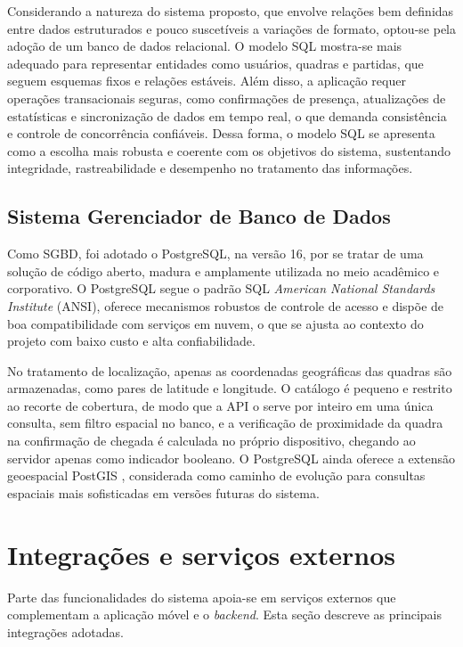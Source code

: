         Considerando a natureza do sistema proposto, que envolve relações bem definidas entre dados estruturados e pouco suscetíveis a variações de formato, optou-se pela adoção de um banco de dados relacional. O modelo SQL mostra-se mais adequado para representar entidades como usuários, quadras e partidas, que seguem esquemas fixos e relações estáveis. Além disso, a aplicação requer operações transacionais seguras, como confirmações de presença, atualizações de estatísticas e sincronização de dados em tempo real, o que demanda consistência e controle de concorrência confiáveis. Dessa forma, o modelo SQL se apresenta como a escolha mais robusta e coerente com os objetivos do sistema, sustentando integridade, rastreabilidade e desempenho no tratamento das informações.

        \subsection{Sistema Gerenciador de Banco de Dados}

        Como SGBD, foi adotado o PostgreSQL, na versão 16, por se tratar de uma solução de código aberto, madura e amplamente utilizada no meio acadêmico e corporativo. O PostgreSQL segue o padrão SQL \textit{American National Standards Institute} (ANSI), oferece mecanismos robustos de controle de acesso e dispõe de boa compatibilidade com serviços em nuvem, o que se ajusta ao contexto do projeto com baixo custo e alta confiabilidade.

        No tratamento de localização, apenas as coordenadas geográficas das quadras são armazenadas, como pares de latitude e longitude. O catálogo é pequeno e restrito ao recorte de cobertura, de modo que a API o serve por inteiro em uma única consulta, sem filtro espacial no banco, e a verificação de proximidade da quadra na confirmação de chegada é calculada no próprio dispositivo, chegando ao servidor apenas como indicador booleano. O PostgreSQL ainda oferece a extensão geoespacial PostGIS \cite{postgis_docs}, considerada como caminho de evolução para consultas espaciais mais sofisticadas em versões futuras do sistema.

    \section{Integrações e serviços externos}
    \label{sec:integracoes}

        Parte das funcionalidades do sistema apoia-se em serviços externos que complementam a aplicação móvel e o \textit{backend}. Esta seção descreve as principais integrações adotadas.

